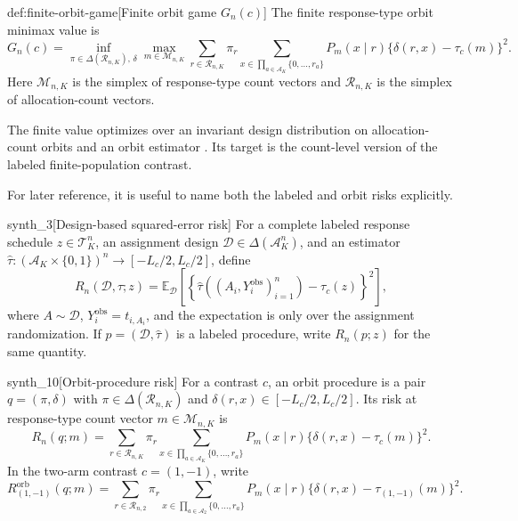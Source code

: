 \documentclass[11pt]{article}
\begin{document}
\begin{definitionv}{def:finite-orbit-game}[Finite orbit game $G_n(c)$]
The finite response-type orbit minimax value is
\[
G_n(c)=\inf_{\pi\in\Delta(\mathcal R_{n,K}),\,\delta}\max_{m\in\mathcal M_{n,K}}\sum_{r\in\mathcal R_{n,K}}\pi_r\sum_{x\in\prod_{a\in\mathcal A_K}\{0,\ldots,r_a\}}P_m(x\mid r)\{\delta(r,x)-\tau_c(m)\}^2.
\]
Here \(\mathcal M_{n,K}\) is the simplex of response-type count vectors and \(\mathcal R_{n,K}\) is the simplex of allocation-count vectors.
\end{definitionv}

The finite value  optimizes over an invariant design distribution  on allocation-count orbits and an orbit estimator . Its target  is the count-level version of the labeled finite-population contrast.

For later reference, it is useful to name both the labeled and orbit risks explicitly.

\begin{definitionv}{synth_3}[Design-based squared-error risk]
For a complete labeled response schedule \(z\in\mathcal T_K^n\), an assignment design \(\mathcal D\in\Delta(\mathcal A_K^n)\), and an estimator \(\widehat\tau:(\mathcal A_K\times\{0,1\})^n\to[-L_c/2,L_c/2]\), define
\[
R_n(\mathcal D,\widehat\tau;z)
=\mathbb E_{\mathcal D}\left[\left\{\widehat\tau((A_i,Y_i^{\mathrm{obs}})_{i=1}^n)-\tau_c(z)\right\}^2\right],
\]
where \(A\sim\mathcal D\), \(Y_i^{\mathrm{obs}}=t_{i,A_i}\), and the expectation is only over the assignment randomization. If \(p=(\mathcal D,\widehat\tau)\) is a labeled procedure, write \(R_n(p;z)\) for the same quantity.
\end{definitionv}

\begin{definitionv}{synth_10}[Orbit-procedure risk]
For a contrast $c$, an orbit procedure is a pair $q=(\pi,\delta)$ with $\pi\in\Delta(\mathcal R_{n,K})$ and $\delta(r,x)\in[-L_c/2,L_c/2]$. Its risk at response-type count vector $m\in\mathcal M_{n,K}$ is
\[
R_n(q;m)=\sum_{r\in\mathcal R_{n,K}}\pi_r\sum_{x\in\prod_{a\in\mathcal A_K}\{0,\ldots,r_a\}}P_m(x\mid r)\{\delta(r,x)-\tau_c(m)\}^2.
\]
In the two-arm contrast $c=(1,-1)$, write
\[
R^{\mathrm{orb}}_{(1,-1)}(q;m)=\sum_{r\in\mathcal R_{n,2}}\pi_r\sum_{x\in\prod_{a\in\mathcal A_2}\{0,\ldots,r_a\}}P_m(x\mid r)\{\delta(r,x)-\tau_{(1,-1)}(m)\}^2.
\]
\end{definitionv}
\end{document}
